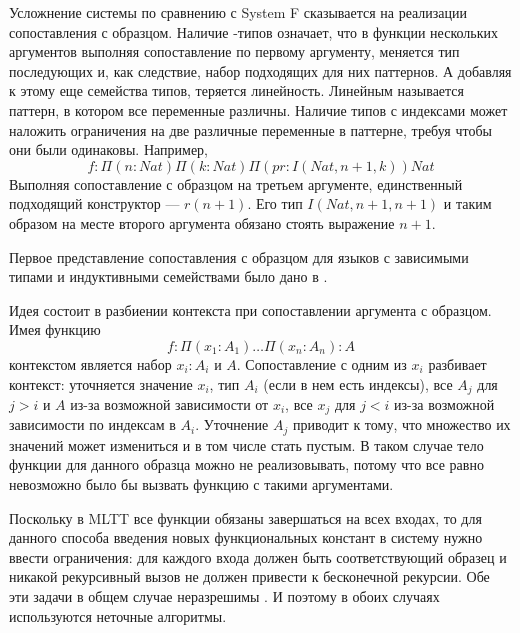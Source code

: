 \label{dependent-pattern-matching}
Усложнение системы по сравнению с System F сказывается на реализации сопоставления
с образцом. Наличие \textPi-типов означает, что в функции нескольких аргументов
выполняя сопоставление по первому аргументу, меняется тип последующих и, как
следствие, набор подходящих для них паттернов. А добавляя к этому еще семейства
типов, теряется линейность. Линейным называется паттерн, в котором все переменные
различны. Наличие типов с индексами может наложить ограничения
на две различные переменные в паттерне, требуя чтобы они были одинаковы. Например,
\[
f : \Pi(n : Nat) \Pi(k : Nat) \Pi(pr : I(Nat, n + 1, k)) Nat
\]
Выполняя
сопоставление с образцом на третьем аргументе, единственный подходящий конструктор
--- \(r(n + 1)\). Его тип \(I(Nat, n + 1, n + 1)\) и таким образом на месте второго
аргумента обязано стоять выражение \(n + 1\).

Первое представление сопоставления с образцом для языков с зависимыми типами и
индуктивными семействами было дано в \cite{dependent-pattern-matching}.

Идея состоит в разбиении контекста при сопоставлении аргумента с образцом.
Имея функцию
\[
f : \Pi (x_1 : A_1) \dots \Pi (x_n : A_n) : A
\]
контекстом является набор \(x_i : A_i\) и \(A\). Сопоставление с одним из \(x_i\)
разбивает контекст: уточняется значение \(x_i\), тип \(A_i\) (если в нем есть
индексы), все \(A_j\) для \(j > i\) и \(A\) из-за возможной зависимости от \(x_i\),
все \(x_j\) для \(j < i\) из-за возможной зависимости по индексам в \(A_i\).
Уточнение \(A_j\) приводит к тому, что множество их значений может измениться
и в том числе стать пустым. В таком случае тело функции для данного образца
можно не реализовывать, потому что все равно невозможно было бы вызвать функцию
с такими аргументами.

Поскольку в MLTT все функции обязаны завершаться на всех входах, то для
данного способа введения новых функциональных констант в систему нужно ввести
ограничения: для каждого входа должен быть соответствующий образец и никакой
рекурсивный вызов не должен привести к бесконечной рекурсии. Обе эти задачи
в общем случае неразрешимы \cite{eliminating-dependent-pattern-matching}. И
поэтому в обоих случаях используются неточные алгоритмы.
